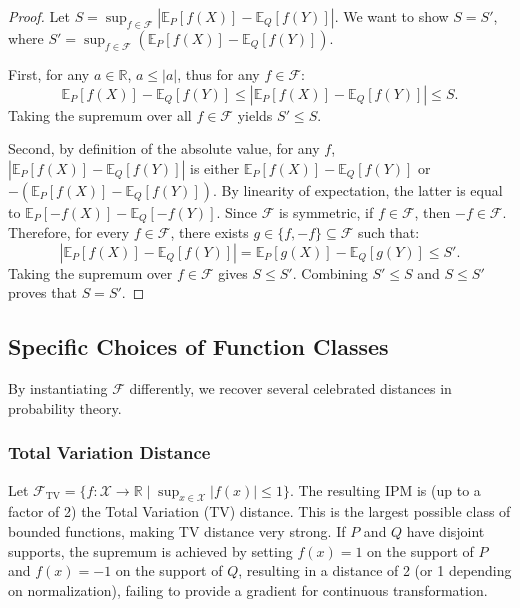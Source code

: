 \begin{proof}
Let $S = \sup_{f \in \mathcal{F}} \left| \mathbb{E}_{P}[f(X)] - \mathbb{E}_{Q}[f(Y)] \right|$. We want to show $S = S'$, where $S' = \sup_{f \in \mathcal{F}} ( \mathbb{E}_{P}[f(X)] - \mathbb{E}_{Q}[f(Y)] )$. 

First, for any $a \in \mathbb{R}$, $a \le |a|$, thus for any $f \in \mathcal{F}$:
\begin{equation*}
    \mathbb{E}_{P}[f(X)] - \mathbb{E}_{Q}[f(Y)] \le \left| \mathbb{E}_{P}[f(X)] - \mathbb{E}_{Q}[f(Y)] \right| \le S.
\end{equation*}
Taking the supremum over all $f \in \mathcal{F}$ yields $S' \le S$.

Second, by definition of the absolute value, for any $f$, $\left| \mathbb{E}_{P}[f(X)] - \mathbb{E}_{Q}[f(Y)] \right|$ is either $\mathbb{E}_{P}[f(X)] - \mathbb{E}_{Q}[f(Y)]$ or $-(\mathbb{E}_{P}[f(X)] - \mathbb{E}_{Q}[f(Y)])$. By linearity of expectation, the latter is equal to $\mathbb{E}_{P}[-f(X)] - \mathbb{E}_{Q}[-f(Y)]$.
Since $\mathcal{F}$ is symmetric, if $f \in \mathcal{F}$, then $-f \in \mathcal{F}$. Therefore, for every $f \in \mathcal{F}$, there exists $g \in \{f, -f\} \subseteq \mathcal{F}$ such that:
\begin{equation*}
    \left| \mathbb{E}_{P}[f(X)] - \mathbb{E}_{Q}[f(Y)] \right| = \mathbb{E}_{P}[g(X)] - \mathbb{E}_{Q}[g(Y)] \le S'.
\end{equation*}
Taking the supremum over $f \in \mathcal{F}$ gives $S \le S'$. Combining $S' \le S$ and $S \le S'$ proves that $S = S'$.
\end{proof}

\subsection{Specific Choices of Function Classes}

By instantiating $\mathcal{F}$ differently, we recover several celebrated distances in probability theory.

\subsubsection{Total Variation Distance}
Let $\mathcal{F}_{\text{TV}} = \{ f : \mathcal{X} \to \mathbb{R} \mid \sup_{x \in \mathcal{X}} |f(x)| \le 1 \}$. The resulting IPM is (up to a factor of 2) the Total Variation (TV) distance. This is the largest possible class of bounded functions, making TV distance very strong. If $P$ and $Q$ have disjoint supports, the supremum is achieved by setting $f(x)=1$ on the support of $P$ and $f(x)=-1$ on the support of $Q$, resulting in a distance of 2 (or 1 depending on normalization), failing to provide a gradient for continuous transformation.

